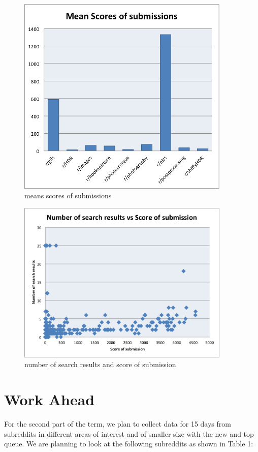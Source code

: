 \documentclass{article} %
\begin{document}
\begin{figure}[h]
\begin{center}
\includegraphics[width=4in]{graph2.png}
\caption{means scores of submissions}
\end{center}
\end{figure}

\begin{figure}[h]
\begin{center}
\includegraphics[width=4in]{graph5.png}
\caption{number of search results and score of submission}
\end{center}
\end{figure}


\section{Work Ahead}
For the second part of the term, we plan to collect data for 15 days from subreddits in different areas of interest and of smaller size with the new and top queue. We are planning to look at the following subreddits as shown in Table 1:
\end{document}
